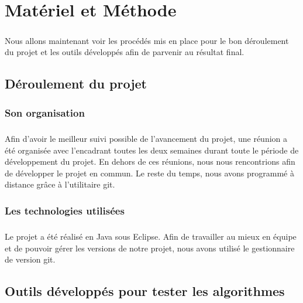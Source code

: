 \documentclass[pidr]{tnreport}
\begin{document}
\clearpage

\chapter{Matériel et Méthode}

\paragraph{}
Nous allons maintenant voir les procédés mis en place pour le bon déroulement du projet et les outils développés afin de parvenir au résultat final.

	\section{Déroulement du projet}

		\subsection{Son organisation}

\paragraph{}
Afin d'avoir le meilleur suivi possible de l'avancement du projet, une réunion a été organisée avec l'encadrant toutes les deux semaines durant toute le période de développement du projet. En dehors de ces réunions, nous nous rencontrions afin de développer le projet en commun. Le reste du temps, nous avons programmé à distance grâce à l'utilitaire git.

		\subsection{Les technologies utilisées}

\paragraph{}
Le projet a été réalisé en Java sous Eclipse. \linebreak
Afin de travailler au mieux en équipe et de pouvoir gérer les versions de notre projet, nous avons utilisé le gestionnaire de version git. \linebreak
		
	\section{Outils développés pour tester les algorithmes}
	
\end{document}
